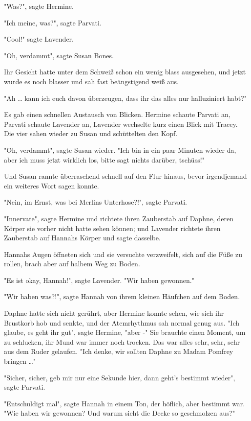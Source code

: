 {"Was?", sagte Hermine.

"Ich meine, was?", sagte Parvati.

"Cool!" sagte Lavender.

"Oh, verdammt", sagte Susan Bones.

Ihr Gesicht hatte unter dem Schweiß schon ein wenig blass ausgesehen, und jetzt wurde es noch blasser und sah fast beängstigend weiß aus.

"Ah … kann ich euch davon überzeugen, dass ihr das alles nur halluziniert habt?"

Es gab einen schnellen Austausch von Blicken. Hermine schaute Parvati an, Parvati schaute Lavender an, Lavender wechselte kurz einen Blick mit Tracey. Die vier sahen wieder zu Susan und schüttelten den Kopf.

"Oh, verdammt", sagte Susan wieder. "Ich bin in ein paar Minuten wieder da, aber ich muss jetzt wirklich los, bitte sagt nichts darüber, tschüss!"

Und Susan rannte überraschend schnell auf den Flur hinaus, bevor irgendjemand ein weiteres Wort sagen konnte.

"Nein, im Ernst, was bei Merlins Unterhose?!", sagte Parvati.

"Innervate", sagte Hermine und richtete ihren Zauberstab auf Daphne, deren Körper sie vorher nicht hatte sehen können; und Lavender richtete ihren Zauberstab auf Hannahs Körper und sagte dasselbe.

Hannahs Augen öffneten sich und sie versuchte verzweifelt, sich auf die Füße zu rollen, brach aber auf halbem Weg zu Boden.

"Es ist okay, Hannah!", sagte Lavender. "Wir haben gewonnen."

"Wir haben was?!", sagte Hannah von ihrem kleinen Häufchen auf dem Boden.

Daphne hatte sich nicht gerührt, aber Hermine konnte sehen, wie sich ihr Brustkorb hob und senkte, und der Atemrhythmus sah normal genug aus. "Ich glaube, es geht ihr gut", sagte Hermine, "aber -" Sie brauchte einen Moment, um zu schlucken, ihr Mund war immer noch trocken. Das war alles sehr, sehr, sehr aus dem Ruder gelaufen. "Ich denke, wir sollten Daphne zu Madam Pomfrey bringen …"

"Sicher, sicher, geb mir nur eine Sekunde hier, dann geht's bestimmt wieder", sagte Parvati.

"Entschuldigt mal", sagte Hannah in einem Ton, der höflich, aber bestimmt war. "Wie haben wir gewonnen? Und warum sieht die Decke so geschmolzen aus?"

}
